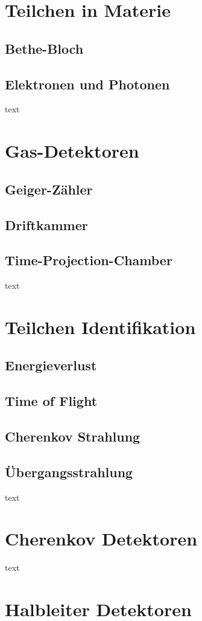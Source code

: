 \section{Teilchen in Materie}
\subsection{Bethe-Bloch}
\subsection{Elektronen und Photonen}
text
\section{Gas-Detektoren}
\subsection{Geiger-Zähler}
\subsection{Driftkammer}
\subsection{Time-Projection-Chamber}
text
\section{Teilchen Identifikation}
\subsection{Energieverlust}
\subsection{Time of Flight}
\subsection{Cherenkov Strahlung}
\subsection{Übergangsstrahlung}
text
\section{Cherenkov Detektoren}
text
\section{Halbleiter Detektoren}

